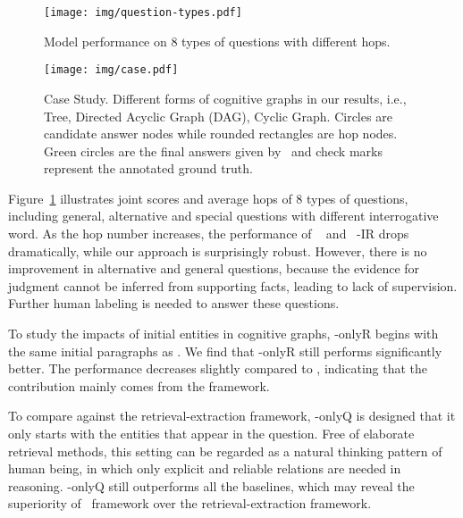 \begin{figure}[hbt]
    \centering
    \texttt{[image: img/question-types.pdf]}
    \addtolength{\belowcaptionskip}{-13pt}
    \addtolength{\abovecaptionskip}{-16pt}
    \caption{Model performance on 8 types of questions with different hops. 
}
    \label{fig:question_types}
\end{figure}
\begin{figure*}[h]
    \centering
    \texttt{[image: img/case.pdf]}
    \addtolength{\belowcaptionskip}{-13pt}
    \addtolength{\abovecaptionskip}{-16pt}
    \caption{Case Study. Different forms of cognitive graphs in our results, i.e., Tree, Directed Acyclic Graph (DAG), Cyclic Graph. Circles are candidate answer nodes while rounded rectangles are hop nodes. Green circles are the final answers given by \name~and check marks represent the annotated ground truth.
}
    \label{fig:case}
\end{figure*}
 Figure~\ref{fig:question_types} illustrates joint  scores and average hops of 8 types of questions, including general, alternative and special questions with different interrogative word. 
As the hop number increases, the performance of ~\citet{yang2018hotpotqa} and ~\citet{yang2018hotpotqa}-IR drops dramatically, while our approach is surprisingly robust.
However, there is no improvement in alternative and general questions, because the evidence for judgment cannot be inferred from supporting facts, leading to lack of supervision. Further human labeling is needed to answer these questions.  

To study the impacts of initial entities in cognitive graphs, \name-onlyR begins with the same initial paragraphs as \cite{yang2018hotpotqa}. We find that \name-onlyR still performs significantly better. The performance decreases slightly compared to \name, indicating that the contribution mainly comes from the framework. 

To compare against the retrieval-extraction framework, \name-onlyQ is designed that it only starts with the entities that appear in the question. 
Free of elaborate retrieval methods, this setting can be regarded as a natural thinking pattern of human being, in which only explicit and reliable relations are needed in reasoning.  
\name-onlyQ still outperforms all the baselines, which may reveal the superiority of \name~framework over the retrieval-extraction framework.




